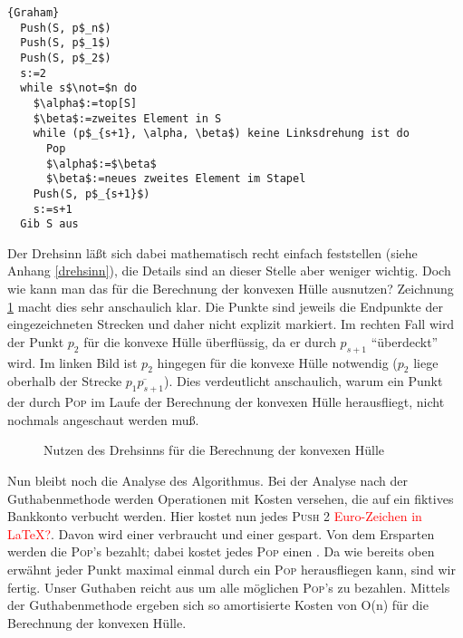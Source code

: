 \documentclass[ngerman,draft,parskip=half*,twoside]{scrreprt}
\theoremstyle{break}
\begin{document}
\begin{Algorithmus}[H]
\begin{lstlisting}[frame=tlrb, mathescape=true, title=\textsc{Graham}, gobble=1]{Graham}
  Push(S, p$_n$)
  Push(S, p$_1$)
  Push(S, p$_2$)
  s:=2
  while s$\not=$n do
    $\alpha$:=top[S]
    $\beta$:=zweites Element in S
    while (p$_{s+1}, \alpha, \beta$) keine Linksdrehung ist do
      Pop
      $\alpha$:=$\beta$
      $\beta$:=neues zweites Element im Stapel
    Push(S, p$_{s+1}$)
    s:=s+1
  Gib S aus    
\end{lstlisting}
\end{Algorithmus}

Der Drehsinn läßt sich dabei mathematisch recht einfach feststellen (siehe Anhang \ref{drehsinn}), die Details sind an dieser Stelle
aber weniger wichtig.
Doch wie kann man das für die Berechnung
der konvexen Hülle ausnutzen? Zeichnung \ref{konvexedrehungskizze} macht dies sehr anschaulich klar. Die Punkte sind jeweils die
Endpunkte der eingezeichneten Strecken und daher nicht explizit markiert. Im rechten Fall wird der Punkt $p_2$ für die konvexe Hülle
überflüssig, da er durch $p_{s+1}$ "`überdeckt"' wird. Im linken Bild ist $p_2$ hingegen für die konvexe Hülle notwendig ($p_2$
liege oberhalb der Strecke $\overline{p_1p_{s+1}}$). Dies verdeutlicht anschaulich, warum ein Punkt der durch
\textsc{Pop} im Laufe der Berechnung der konvexen Hülle herausfliegt, nicht nochmals angeschaut werden muß.

\begin{figure}[H]
\centering


\caption{Nutzen des Drehsinns für die Berechnung der konvexen Hülle}
\label{konvexedrehungskizze}
\end{figure}

Nun bleibt noch die Analyse des Algorithmus. Bei der Analyse nach der Guthabenmethode werden Operationen mit Kosten versehen, die auf ein fiktives Bankkonto
verbucht werden. Hier kostet nun jedes \textsc{Push} 2 \textcolor{red}{Euro-Zeichen in LaTeX?}. Davon wird einer verbraucht und einer
gespart. Von dem Ersparten werden die \textsc{Pop}'s bezahlt; dabei kostet jedes \textsc{Pop} einen . Da wie bereits oben erwähnt jeder
Punkt maximal einmal durch ein \textsc{Pop} herausfliegen kann, sind wir fertig. Unser Guthaben reicht aus um alle möglichen
\textsc{Pop}'s zu bezahlen. Mittels der Guthabenmethode ergeben sich so amortisierte Kosten von O(n) für die Berechnung der konvexen
Hülle.
\end{document}
